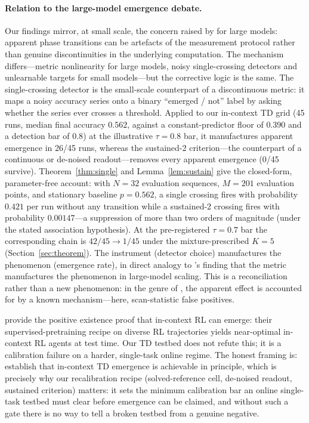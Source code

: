 \documentclass[11pt]{article}
\theoremstyle{plain}
\theoremstyle{definition}
\begin{document}
\paragraph{Relation to the large-model emergence debate.}
Our findings mirror, at small scale, the concern raised by \citet{schaeffer2023mirage}
for large models: apparent phase transitions can be artefacts of the measurement
protocol rather than genuine discontinuities in the underlying computation.
The mechanism differs---metric nonlinearity for large models, noisy single-crossing
detectors and unlearnable targets for small models---but the corrective logic is the same.
The single-crossing detector is the small-scale counterpart of a discontinuous metric: it
maps a noisy accuracy series onto a binary ``emerged / not'' label by asking whether the
series ever crosses a threshold.
Applied to our in-context TD grid (45 runs, median final accuracy $0.562$, against a
constant-predictor floor of $0.390$ and a detection bar of $0.8$)
at the illustrative $\tau=0.8$ bar, it manufactures apparent emergence in 26/45 runs, whereas the sustained-2 criterion---the
counterpart of a continuous or de-noised readout---removes every apparent emergence (0/45
survive).
Theorem~\ref{thm:single} and Lemma~\ref{lem:sustain} give the closed-form, parameter-free account: with $N=32$ evaluation
sequences, $M=201$ evaluation points, and stationary baseline $p=0.562$, a single crossing
fires with probability $0.421$ per run without any transition while a sustained-2 crossing fires with
probability $0.00147$---a suppression of more than two orders of magnitude (under the
stated association hypothesis). At the pre-registered $\tau=0.7$ bar the corresponding chain is
$42/45\to1/45$ under the mixture-prescribed $K=5$ (Section~\ref{sec:theorem}).
The instrument (detector choice) manufactures the phenomenon (emergence rate), in direct
analogy to \citeauthor{schaeffer2023mirage}'s finding that the metric manufactures the
phenomenon in large-model scaling. This is a reconciliation rather than a new phenomenon: in
the genre of \citet{oneto2026}, the apparent effect is accounted for by a known
mechanism---here, scan-statistic false positives.

\citet{lee2023icrl} provide the positive existence proof that in-context RL can
emerge: their supervised-pretraining recipe on diverse RL trajectories yields near-optimal
in-context RL agents at test time.
Our TD testbed does not refute this; it is a calibration failure on a harder, single-task
online regime.
The honest framing is: \citeauthor{lee2023icrl} establish that in-context TD emergence is
achievable in principle, which is precisely why our recalibration recipe (solved-reference
cell, de-noised readout, sustained criterion) matters: it sets the minimum calibration bar
an online single-task testbed must clear before emergence can be claimed, and without such a
gate there is no way to tell a broken testbed from a genuine negative.
\end{document}
